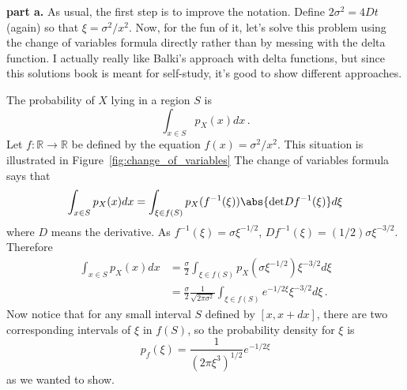 

\textbf{part a.} As usual, the first step is to improve the notation.
Define $2 \sigma^2 = 4 D t$ (again) so that $\xi = \sigma^2 / x^2$.
Now, for the fun of it, let's solve this problem using the change of variables formula directly rather than by messing with the delta function.
I actually really like Balki's approach with delta functions, but since this solutions book is meant for self-study, it's good to show different approaches.


The probability of $X$ lying in a region $S$ is
\begin{equation*}
  \int_{x \in S} p_X(x) dx
  \, .
\end{equation*}
Let $f:\mathbb{R} \rightarrow \mathbb{R}$ be defined by the equation $f(x) = \sigma^2 / x^2$.
This situation is illustrated in Figure~\ref{fig:change_of_variables}
The change of variables formula says that
\begin{equation*}
  \int_{x\in S}p_X(x) dx
  = \int_{\xi \in f(S)} p_X(f^{-1}(\xi)) \abs{\text{det} D f^{-1}(\xi)} d\xi
\end{equation*}
where $D$ means the derivative.
As $f^{-1}(\xi) = \sigma \xi^{-1/2}$, $Df^{-1}(\xi) = (1/2) \sigma \xi^{-3/2}$.
Therefore
\begin{align*}
  \int_{x\in S}p_X(x) dx
  &= \frac{\sigma}{2} \int_{\xi \in f(S)} p_X(\sigma \xi^{-1/2}) \xi^{-3/2} d\xi \\
  &= \frac{\sigma}{2} \frac{1}{\sqrt{2 \pi \sigma^2}} \int_{\xi \in f(S)}
    e^{-1/2 \xi} \xi^{-3/2} d\xi
    \, .
\end{align*}
Now notice that for any small interval $S$ defined by $[x, x + dx]$, there are two corresponding intervals of $\xi$ in $f(S)$, so the probability density for $\xi$ is
\begin{equation*}
  p_f(\xi) = \frac{1}{\left( 2 \pi \xi^3 \right)^{1/2}} e^{-1 / 2 \xi}
\end{equation*}
as we wanted to show.

